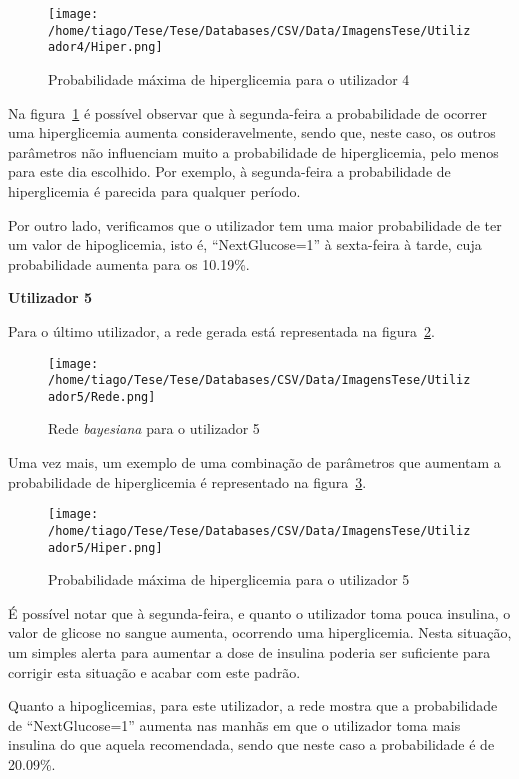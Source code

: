 \begin{figure}[H]
\centering
\texttt{[image: /home/tiago/Tese/Tese/Databases/CSV/Data/ImagensTese/Utilizador4/Hiper.png]}
\caption{Probabilidade máxima de hiperglicemia para o utilizador 4}
\label{fig:hiper4}
\end{figure}
Na figura~\ref{fig:hiper4} é possível observar que à segunda-feira a probabilidade de ocorrer uma hiperglicemia aumenta consideravelmente, sendo que, neste caso, os outros parâmetros não influenciam muito a probabilidade de hiperglicemia, pelo menos para este dia escolhido. Por exemplo, à segunda-feira a probabilidade de hiperglicemia é parecida para qualquer período.

Por outro lado, verificamos que o utilizador tem uma maior probabilidade de ter um valor de hipoglicemia, isto é, ``Next\textunderscore Glucose=1'' à sexta-feira à tarde, cuja probabilidade aumenta para os 10.19\%.


\textbf{Utilizador 5}


Para o último utilizador, a rede gerada está representada na figura~\ref{fig:sam5}.

\begin{figure}[H]
\centering
\texttt{[image: /home/tiago/Tese/Tese/Databases/CSV/Data/ImagensTese/Utilizador5/Rede.png]}
\caption{Rede \textit{bayesiana} para o utilizador 5}
\label{fig:sam5}
\end{figure}
Uma vez mais, um exemplo de uma combinação de parâmetros que aumentam a probabilidade de hiperglicemia é representado na figura~\ref{fig:hiper5}.

\begin{figure}[H]
\centering
\texttt{[image: /home/tiago/Tese/Tese/Databases/CSV/Data/ImagensTese/Utilizador5/Hiper.png]}
\caption{Probabilidade máxima de hiperglicemia para o utilizador 5}
\label{fig:hiper5}
\end{figure}
É possível notar que à segunda-feira, e quanto o utilizador toma pouca insulina, o valor de glicose no sangue aumenta, ocorrendo uma hiperglicemia. Nesta situação, um simples alerta para aumentar a dose de insulina poderia ser suficiente para corrigir esta situação e acabar com este padrão.

Quanto a hipoglicemias, para este utilizador, a rede mostra que a probabilidade de ``Next\textunderscore Glucose=1'' aumenta nas manhãs em que o utilizador toma mais insulina do que aquela recomendada, sendo que neste caso a probabilidade é de 20.09\%.



